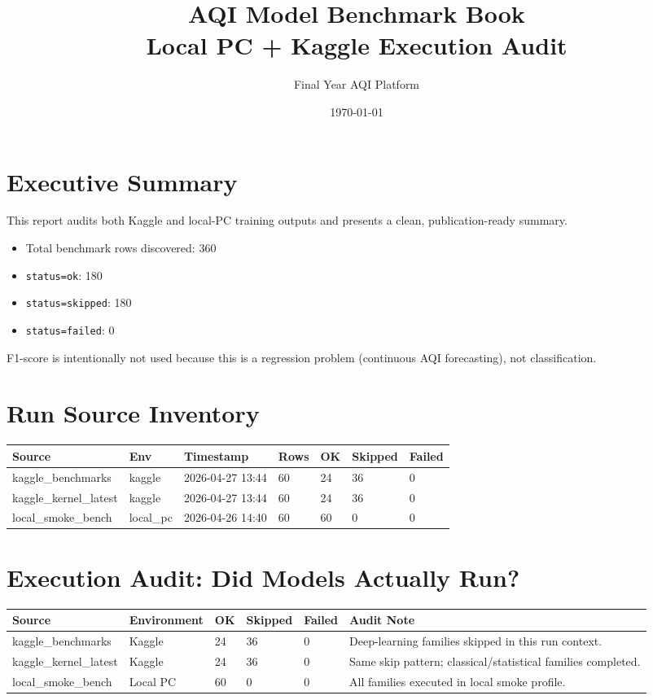 \documentclass[11pt,a4paper,oneside]{book}
\title{\Huge\textbf{AQI Model Benchmark Book}\\\Large Local PC + Kaggle Execution Audit}
\author{Final Year AQI Platform}
\date{\today}
\begin{document}
\maketitle
\tableofcontents

\chapter{Executive Summary}
This report audits both Kaggle and local-PC training outputs and presents a clean, publication-ready summary.

\begin{itemize}
  \item Total benchmark rows discovered: 360
  \item \texttt{status=ok}: 180
  \item \texttt{status=skipped}: 180
  \item \texttt{status=failed}: 0
\end{itemize}

F1-score is intentionally not used because this is a regression problem (continuous AQI forecasting), not classification.

\chapter{Run Source Inventory}
\small
\begin{longtable}{@{}L{3.2cm}L{1.5cm}L{2.2cm}L{1.0cm}L{1.0cm}L{1.2cm}L{1.0cm}@{}}
\toprule
Source & Env & Timestamp & Rows & OK & Skipped & Failed \\
\midrule
kaggle\_benchmarks & kaggle & 2026-04-27 13:44 & 60 & 24 & 36 & 0 \\
kaggle\_kernel\_latest & kaggle & 2026-04-27 13:44 & 60 & 24 & 36 & 0 \\
local\_smoke\_bench & local\_pc & 2026-04-26 14:40 & 60 & 60 & 0 & 0 \\
\bottomrule
\end{longtable}
\normalsize

\chapter{Execution Audit: Did Models Actually Run?}
\footnotesize
\begin{longtable}{@{}L{2.8cm}L{1.8cm}L{1.0cm}L{1.0cm}L{1.0cm}L{3.6cm}@{}}
\toprule
Source & Environment & OK & Skipped & Failed & Audit Note \\
\midrule
kaggle\_benchmarks & Kaggle & 24 & 36 & 0 & Deep-learning families skipped in this run context. \\
kaggle\_kernel\_latest & Kaggle & 24 & 36 & 0 & Same skip pattern; classical/statistical families completed. \\
local\_smoke\_bench & Local PC & 60 & 0 & 0 & All families executed in local smoke profile. \\
\bottomrule
\end{longtable}
\normalsize
\end{document}
